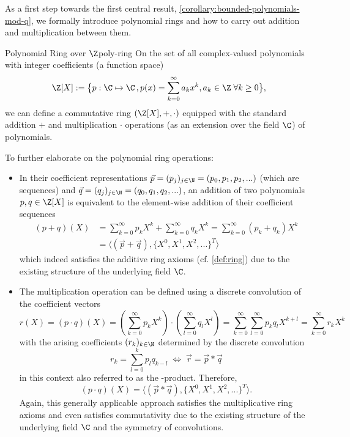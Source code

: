 As a first step towards the first central result, \cref{corollary:bounded-polynomials-mod-q}, we formally introduce polynomial rings and how to carry out addition and multiplication between them.

\begin{definition}{Polynomial Ring over $\Z$}{poly-ring}
  On the set of all complex-valued polynomials with integer coefficients (a function space)
  $$\Z[X] := \big\{p: \C \mapsto \C \,, p(x) = \sum_{k=0}^\infty a_k x^k, a_k \in \Z \;\forall k \geq 0\big\},$$
  we can define a commutative ring $(\Z[X], +, \cdot)$ equipped with the standard addition $+$ and multiplication $\cdot$ operations (as an extension over the field $\C$) of polynomials.
\end{definition}

To further elaborate on the polynomial ring operations:
\begin{itemize}
  \item In their coefficient representations $\vec{p} = (p_j)_{j\in\N} = (p_0, p_1, p_2, ...)$ (which are sequences) and $\vec{q} = (q_j)_{j\in\N} = (q_0, q_1, q_2, ...)$, an addition of two polynomials $p, q \in \Z[X]$ is equivalent to the element-wise addition of their coefficient sequences
        \begin{align*}
          (p + q)(X) & = \sum_{k=0}^\infty p_k X^k + \sum_{k=0}^\infty q_k X^k = \sum_{k=0}^\infty (p_k + q_k) X^k \\
                     & = \langle (\vec{p} + \vec{q}), \{X^0, X^1, X^2, ...\}^T \rangle
        \end{align*}
        which indeed satisfies the additive ring axioms (cf. \cref{def:ring}) due to the existing structure of the underlying field $\C$.
  \item The multiplication operation can be defined using a discrete convolution of the coefficient vectors
        $$r(X) = (p \cdot q)(X) = (\sum_{k=0}^\infty p_k X^k) \cdot (\sum_{l=0}^\infty q_l X^l)
          = \sum_{k=0}^\infty \sum_{l=0}^\infty p_k q_l X^{k+l}
          = \sum_{k=0}^\infty r_k X^k$$
        with the arising coefficients $(r_k)_{k\in\N}$ determined by the discrete convolution
        $$r_k = \sum_{l=0}^k p_l q_{k-l} \;\Leftrightarrow\; \vec{r} = \vec{p} * \vec{q}$$
        in this context also referred to as the -product. Therefore,
        $$(p \cdot q)(X) = \langle (\vec{p} * \vec{q}), \{X^0, X^1, X^2, ...\}^T \rangle.$$
        Again, this generally applicable approach satisfies the multiplicative ring axioms and even satisfies commutativity due to the existing structure of the underlying field $\C$ and the symmetry of convolutions.
\end{itemize}

